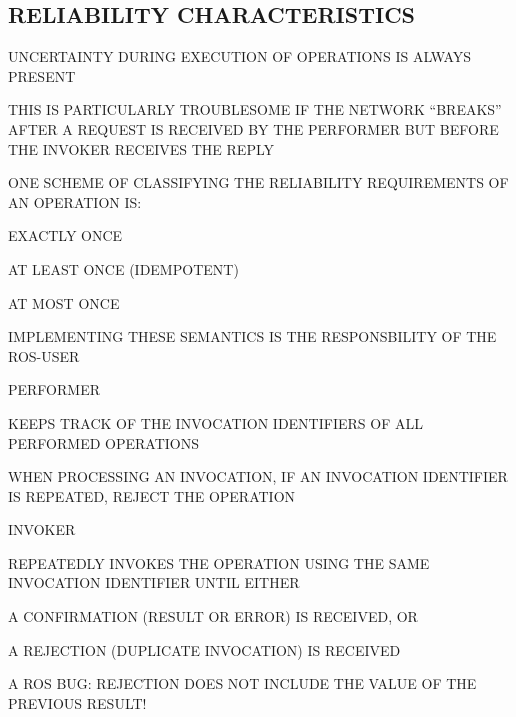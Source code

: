 \begin{bwslide}
\part*	{RELIABILITY CHARACTERISTICS}\bf

\begin{nrtc}
\item	UNCERTAINTY DURING EXECUTION OF OPERATIONS IS ALWAYS PRESENT

\item	THIS IS PARTICULARLY TROUBLESOME IF THE NETWORK ``BREAKS''
	AFTER A REQUEST IS RECEIVED BY THE PERFORMER BUT BEFORE
	THE INVOKER RECEIVES THE REPLY

\item	ONE SCHEME OF CLASSIFYING THE RELIABILITY REQUIREMENTS OF AN OPERATION
	IS:
    \begin{nrtc}
    \item	EXACTLY ONCE

    \item	AT LEAST ONCE (IDEMPOTENT)

    \item	AT MOST ONCE
    \end{nrtc}

\item	IMPLEMENTING THESE SEMANTICS IS THE RESPONSBILITY OF THE ROS-USER
\end{nrtc}
\end{bwslide}


\begin{bwslide}

\begin{nrtc}
\item	PERFORMER
    \begin{nrtc}
    \item	KEEPS TRACK OF THE INVOCATION IDENTIFIERS OF ALL PERFORMED
		OPERATIONS

    \item	WHEN PROCESSING AN INVOCATION, IF AN INVOCATION IDENTIFIER IS
		REPEATED, REJECT THE OPERATION 
    \end{nrtc}

\item	INVOKER
    \begin{nrtc}
    \item	REPEATEDLY INVOKES THE OPERATION USING THE SAME INVOCATION
		IDENTIFIER UNTIL EITHER

    \item	A CONFIRMATION (RESULT OR ERROR) IS RECEIVED, OR

    \item	A REJECTION (DUPLICATE INVOCATION) IS RECEIVED
    \end{nrtc}

\item	A ROS BUG: REJECTION DOES NOT INCLUDE THE VALUE OF THE PREVIOUS RESULT!
\end{nrtc}
\end{bwslide}


